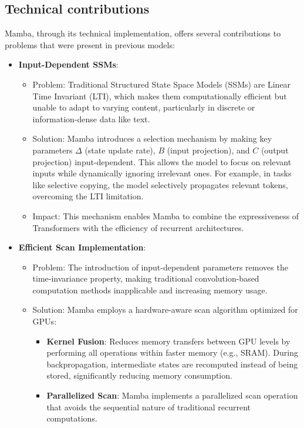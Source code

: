 \documentclass[onecolumn]{IEEEtran}
\begin{document}
\subsection{Technical contributions}
Mamba, through its technical implementation, offers several contributions to problems that were present in previous models:
\begin{itemize}
    \item \textbf{Input-Dependent SSMs}:
        \begin{itemize}
            \item Problem: Traditional Structured State Space Models (SSMs) are Linear Time Invariant (LTI), which makes them computationally efficient but unable to adapt to varying content, particularly in discrete or information-dense data like text.
            \item Solution: Mamba introduces a selection mechanism by making key parameters $\Delta$ (state update rate), $B$ (input projection), and $C$ (output projection) input-dependent. This allows the model to focus on relevant inputs while dynamically ignoring irrelevant ones. For example, in tasks like selective copying, the model selectively propagates relevant tokens, overcoming the LTI limitation.
            \item Impact: This mechanism enables Mamba to combine the expressiveness of Transformers with the efficiency of recurrent architectures.
        \end{itemize}
    \item \textbf{Efficient Scan Implementation}:
        \begin{itemize}
            \item Problem: The introduction of input-dependent parameters removes the time-invariance property, making traditional convolution-based computation methods inapplicable and increasing memory usage.
            \item Solution: Mamba employs a hardware-aware scan algorithm optimized for GPUs:
            \begin{itemize}
                \item \textbf{Kernel Fusion}: Reduces memory transfers between GPU levels by performing all operations within faster memory (e.g., SRAM). During backpropagation, intermediate states are recomputed instead of being stored, significantly reducing memory consumption.
                \item \textbf{Parallelized Scan}: Mamba implements a parallelized scan operation that avoids the sequential nature of traditional recurrent computations.

\end{itemize}
\end{itemize}
\end{itemize}
\end{document}
